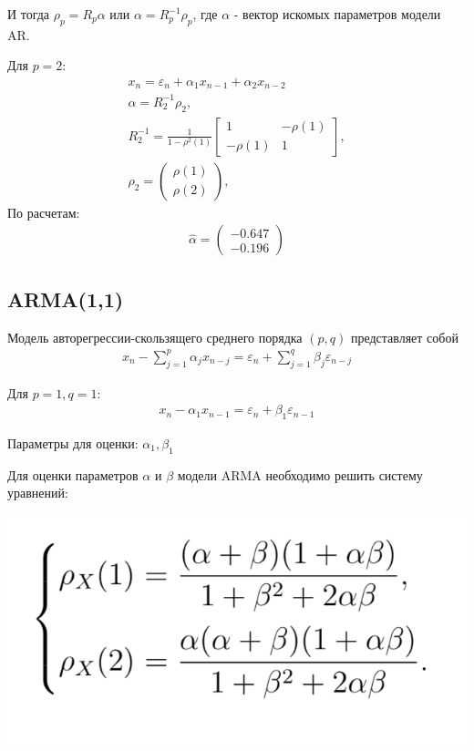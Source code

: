 \documentclass{article}
\begin{document}
И тогда $\rho_p=R_p\alpha$ или $\alpha = R_p^{-1}\rho_p$, где $\alpha$  -  вектор искомых параметров модели AR.

Для $p=2$: 
\begin{gather*}
    x_n = \varepsilon_n + \alpha_1x_{n-1} + \alpha_2x_{n-2}\\
    \alpha = R_2^{-1}\rho_2,\\
    R_2^{-1} = \frac{1}{1-\rho^2(1)}
    \begin{bmatrix} 
        1 & -\rho(1) \\ -\rho(1) & 1
    \end{bmatrix},\\
    \rho_2 = \begin{pmatrix} \rho(1) \\ \rho(2) \end{pmatrix},
\end{gather*}
По расчетам: \newline
\begin{gather*}
    \hat{\alpha} = \begin{pmatrix}-0.647\\-0.196 \end{pmatrix}
\end{gather*}

\subsection{ARMA(1,1)}

Модель авторегрессии-скользящего среднего порядка $(p,q)$ представляет собой
\begin{gather*}
    x_n -\sum_{j=1}^{p}\alpha_jx_{n-j} = \varepsilon_n +\sum_{j=1}^{q}\beta_{j}\varepsilon_{n-j}
\end{gather*}

Для $p=1,q=1$: 
\begin{gather*}
    x_n -\alpha_1x_{n-1} = \varepsilon_n +\beta_{1}\varepsilon_{n-1}
\end{gather*}

Параметры для оценки: $\alpha_1,\beta_1$

Для оценки параметров $\alpha$ и $\beta$ модели ARMA необходимо решить систему уравнений:

\includegraphics[width=\linewidth]{cr1.png}\newline
\end{document}
